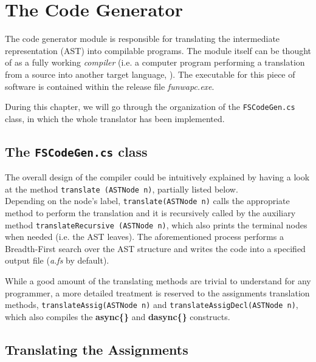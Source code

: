 
\chapter{\label{chapter5} The \fsharp Code Generator}

The code generator module is responsible for translating the \fwap intermediate representation (AST) into compilable \fsharp programs. The module itself can be thought of as a fully working \textit{compiler} (i.e. a computer program performing a translation from a source into another target language, \cite{dragon}). The executable for this piece of software is contained within the release file \textit{funwapc.exe}. 

During this chapter, we will go through the organization of the \texttt{FSCodeGen.cs} class, in which the whole translator has been implemented.

\section{The \texttt{FSCodeGen.cs} class}

The overall design of the compiler could be intuitively explained by having a look at the method \texttt{translate (ASTNode n)}, partially listed below. \\



Depending on the node's label, \texttt{translate(ASTNode n)} calls the appropriate method to perform the translation and it is recursively called by the auxiliary method \texttt{translateRecursive (ASTNode n)}, which also prints the terminal nodes when needed (i.e. the AST leaves). The aforementioned process performs a Breadth-First search over the AST structure and writes the \fsharp code into a specified output file (\textit{a.fs} by default).

While a good amount of the translating methods are trivial to understand for any programmer, a more detailed treatment is reserved to the assignments translation methods, \texttt{translateAssig(ASTNode n)} and \texttt{translateAssigDecl(ASTNode n)}, which also compiles the \textbf{async\{\}} and \textbf{dasync\{\}} constructs.

\section{Translating the Assignments}

